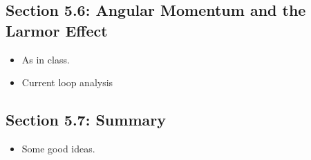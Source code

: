 \documentclass[../notes.tex]{subfiles}
\begin{document}
\subsection*{Section 5.6: Angular Momentum and the Larmor Effect}
\begin{itemize}
    \item As in class.
    \item Current loop analysis
\end{itemize}


\subsection*{Section 5.7: Summary}
\begin{itemize}
    \item Some good ideas.
\end{itemize}
\end{document}
